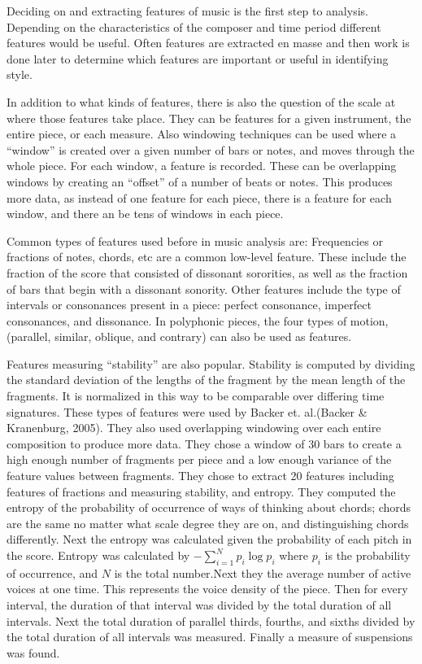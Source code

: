 \documentclass[12pt,twoside]{reedthesis}
\theoremstyle{definition}
\theoremstyle{definition}
\theoremstyle{definition}
\theoremstyle{remark}
\begin{document}
Deciding on and extracting features of music is the first step to
analysis. Depending on the characteristics of the composer and time
period different features would be useful. Often features are extracted
en masse and then work is done later to determine which features are
important or useful in identifying style.

In addition to what kinds of features, there is also the question of the
scale at where those features take place. They can be features for a
given instrument, the entire piece, or each measure. Also windowing
techniques can be used where a ``window'' is created over a given number
of bars or notes, and moves through the whole piece. For each window, a
feature is recorded. These can be overlapping windows by creating an
``offset'' of a number of beats or notes. This produces more data, as
instead of one feature for each piece, there is a feature for each
window, and there an be tens of windows in each piece.

Common types of features used before in music analysis are: Frequencies
or fractions of notes, chords, etc are a common low-level feature. These
include the fraction of the score that consisted of dissonant
sororities, as well as the fraction of bars that begin with a dissonant
sonority. Other features include the type of intervals or consonances
present in a piece: perfect consonance, imperfect consonances, and
dissonance. In polyphonic pieces, the four types of motion, (parallel,
similar, oblique, and contrary) can also be used as features.

Features measuring ``stability'' are also popular. Stability is computed
by dividing the standard deviation of the lengths of the fragment by the
mean length of the fragments. It is normalized in this way to be
comparable over differing time signatures. These types of features were
used by Backer et. al.(Backer \& Kranenburg, 2005). They also used
overlapping windowing over each entire composition to produce more data.
They chose a window of 30 bars to create a high enough number of
fragments per piece and a low enough variance of the feature values
between fragments. They chose to extract 20 features including features
of fractions and measuring stability, and entropy. They computed the
entropy of the probability of occurrence of ways of thinking about
chords; chords are the same no matter what scale degree they are on, and
distinguishing chords differently. Next the entropy was calculated given
the probability of each pitch in the score. Entropy was calculated by
\(-\sum_{i = 1}^{N}p_i\log{p_i}\) where \(p_i\) is the probability of
occurrence, and \(N\) is the total number.Next they the average number
of active voices at one time. This represents the voice density of the
piece. Then for every interval, the duration of that interval was
divided by the total duration of all intervals. Next the total duration
of parallel thirds, fourths, and sixths divided by the total duration of
all intervals was measured. Finally a measure of suspensions was found.
\end{document}
